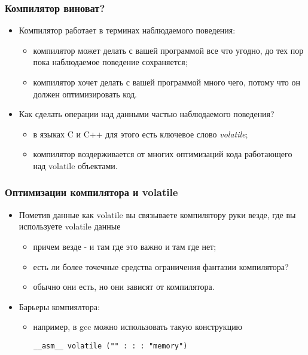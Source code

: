 \begin{frame}
\frametitle{Компилятор виноват?}
\begin{itemize}
  \item Компилятор работает в терминах наблюдаемого поведения:
  \begin{itemize}
    \item компилятор может делать с вашей программой все что угодно, до тех пор
    пока наблюдаемое поведение сохраняется;
    \item компилятор хочет делать с вашей программой много чего, потому что он
    должен оптимизировать код.
  \end{itemize}
  \item Как сделать операции над данными частью наблюдаемого поведения?
  \begin{itemize}
    \item в языках C и C++ для этого есть ключевое слово \emph{volatile};
    \item компилятор воздерживается от многих оптимизаций кода работающего над
    volatile объектами.
  \end{itemize}
\end{itemize}
\end{frame}

\begin{frame}[fragile]
\frametitle{Оптимизации компилятора и volatile}
\begin{itemize}
  \item Пометив данные как volatile вы связываете компилятору руки везде, где
  вы используете volatile данные
  \begin{itemize}
    \item причем везде - и там где это важно и там где нет;
    \item есть ли более точечные средства ограничения фантазии компилятора?
    \item обычно они есть, но они зависят от компилятора.
  \end{itemize}
  \item Барьеры компиялтора:
  \begin{itemize}
    \item например, в gcc можно использовать такую конструкцию
\begin{lstlisting}
__asm__ volatile ("" : : : "memory")
\end{lstlisting}
  \end{itemize}
\end{itemize}
\end{frame}

